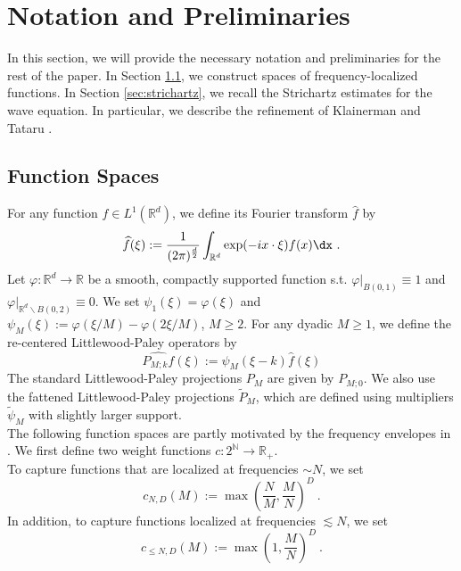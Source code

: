 \documentclass[11pt]{article}
\begin{document}
\section{Notation and Preliminaries}
In this section, we will provide the necessary notation and preliminaries for the rest of the paper. In Section \ref{sec:function_spaces}, we construct spaces of frequency-localized functions. In Section \ref{sec:strichartz}, we recall the Strichartz estimates for the wave equation. In particular, we describe the refinement of Klainerman and Tataru \cite{KT99}. 

\subsection{Function Spaces}\label{sec:function_spaces}
For any function \( f\in L^1(\mathbb{R}^d) \), we define its Fourier transform \( \widehat{f} \)  by
\begin{equation*}
\widehat{f}(\xi) := \frac{1}{(2\pi)^{\frac{d}{2}}} \int_{\mathbb{R}^d} \exp(-i x \cdot \xi) f(x) \dx~. 
\end{equation*}
Let \( \varphi \colon \mathbb{R}^d \rightarrow \mathbb{R} \) be a smooth, compactly supported function s.t. \( \varphi|_{B(0,1)} \equiv 1 \) and \( \varphi|_{\mathbb{R}^d\backslash B(0,2)} \equiv 0 \). We set \( \psi_1(\xi) = \varphi(\xi) \) and \( \psi_M(\xi) := \varphi(\xi/M)- \varphi(2\xi/M) \), \( M \geq 2 \). For any dyadic \( M \geq 1 \), we define the re-centered Littlewood-Paley operators by
\begin{equation*}
\widehat{P_{M;k}f}(\xi):= \psi_M(\xi-k) \widehat{f}(\xi)
\end{equation*}
The standard Littlewood-Paley projections \( P_M \) are given by \( P_{M;0} \).  We also use the fattened Littlewood-Paley projections \( \widetilde{P}_M \), which are defined using multipliers \( \widetilde{\psi}_M \) with slightly larger support. \\
The following function spaces are partly motivated by the frequency envelopes in \cite{Tao01,Tao04}. 
We first define two weight functions \( c \colon 2^\mathbb{N} \rightarrow \mathbb{R}_+ \). \\
To capture functions that are localized at frequencies \( \sim N \), we set
\begin{equation}\label{prelim:eq_cN}
c_{N,D}(M):= \max \left( \frac{N}{M}, \frac{M}{N} \right)^{D}~.
\end{equation}
In addition, to capture functions localized at frequencies \( \lesssim N \), we set 
\begin{equation}\label{prelim:eq_clN}
c_{\leq N,D}(M):= \max \left( 1,\frac{M}{N} \right)^{D}~.
\end{equation}
\end{document}
